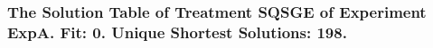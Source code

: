  \begin{frame}
 \fontsize{8pt}{9pt}\selectfont
 \frametitle{ The Solution Table of Treatment SQSGE of Experiment ExpA. Fit: 0. Unique Shortest Solutions: 198. }

 \label{ExpASolutionTable003.tex}  
 \end{frame}

